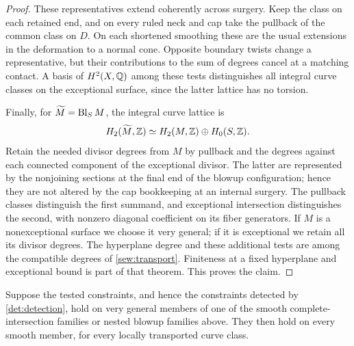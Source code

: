 \begin{proof}
These representatives extend coherently across surgery. Keep the
class on each retained end, and on every ruled neck and cap take the
pullback of the common class on $D$. On each shortened smoothing these
are the usual extensions in the deformation to a normal cone. Opposite
boundary twists change a representative, but their contributions to
the sum of degrees cancel at a matching contact. A basis of
$H^2(X,\mathbb Q)$ among these tests distinguishes all integral curve
classes on the exceptional surface, since the latter lattice has no
torsion.

Finally, for $\widetilde M=\operatorname{Bl}_S M$, the integral curve lattice is
\[
 H_2(\widetilde M,\mathbb Z)
       \simeq H_2(M,\mathbb Z)\oplus H_0(S,\mathbb Z).
\]
Retain the needed divisor degrees from $M$ by pullback and the degrees
against each connected component of the exceptional divisor. The
latter are represented by the nonjoining sections at the final end
of the blowup configuration; hence they are not altered by the cap
bookkeeping at an internal surgery. The pullback classes distinguish
the first summand, and exceptional intersection distinguishes the
second, with nonzero diagonal coefficient on its fiber generators.
If $M$ is a nonexceptional surface we choose it very general; if it is
exceptional we retain all its divisor degrees. The hyperplane degree
and these additional tests are among the compatible degrees of
\cref{sew:transport}. Finiteness at a fixed hyperplane and exceptional
bound is part of that theorem. This proves the claim.
\end{proof}

\begin{lemma}
\label{ind:deformation}
Suppose the tested constraints, and hence the constraints detected by
\cref{det:detection}, hold on very general members of one of the
smooth complete-intersection families or nested blowup families above.
They then hold on every smooth member, for every locally transported
curve class.
\end{lemma}

